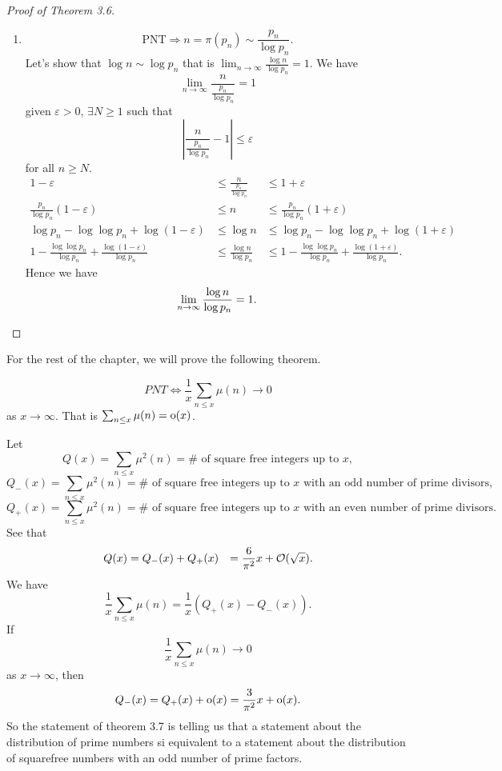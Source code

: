 \documentclass[twoside, openright, fontsize=10pt, headings=big]{scrbook}
\begin{document}
\begin{proof}[Proof of Theorem 3.6]
    \begin{enumerate}
        \item[(1)]
        \[
            \text{PNT}\Rightarrow n=\pi(p_n)\sim\frac{p_n}{\log p_n}.
        \]
        Let's show that $\log n\sim\log p_n$ that is $\lim_{n\to\infty}\frac{\log n}{\log p_n}=1$. We have
        \[
            \lim_{n\to\infty}\frac{n}{\frac{p_n}{\log p_n}}=1
        \]
        given $\varepsilon>0$, $\exists N\geq1$ such that
        \[
            \left|\frac{n}{\frac{p_n}{\log p_n}}-1\right|\leq\varepsilon
        \]
        for all $n\geq N$.
        \begin{align*}
            1-\varepsilon&\leq\frac{n}{\frac{p_n}{\log p_n}}&\leq1+\varepsilon\\
            \frac{p_n}{\log p_n}(1-\varepsilon)&\leq n&\leq\frac{p_n}{\log p_n}(1+\varepsilon)\\
            \log p_n-\log\log p_n+\log(1-\varepsilon)&\leq\log n&\leq\log p_n-\log\log p_n+\log(1+\varepsilon)\\
            1-\frac{\log\log p_n}{\log p_n}+\frac{\log(1-\varepsilon)}{\log p_n}&\leq\frac{\log n}{\log p_n}&\leq1-\frac{\log\log p_n}{\log p_n}+\frac{\log(1+\varepsilon)}{\log p_n}.
        \end{align*}
        Hence we have
        \[
            \lim_{n\to\infty}\frac{\log n}{\log p_n}=1.\qedhere
        \]
    \end{enumerate}
\end{proof}
For the rest of the chapter, we will prove the following theorem.
\begin{theorem}{}{}
    \[
        PNT\Leftrightarrow\frac{1}{x}\sum_{n\leq x}\mu(n)\to0
    \]
    as $x\to\infty$. That is $\sum_{n\leq x}\mu(n)=\oh(x)$.
\end{theorem}
\begin{remark}
    Let 
    \[
        Q(x)=\sum_{n\leq x}\mu^2(n)=\# \text{ of square free integers up to } x,
    \]
    \[
        Q_-(x)=\sum_{n\leq x}\mu^2(n)=\# \text{ of square free integers up to } x \text{ with an odd number of prime divisors},
    \]
    \[
        Q_+(x)=\sum_{n\leq x}\mu^2(n)=\# \text{ of square free integers up to } x \text{ with an even number of prime divisors}.
    \]
    See that
    \begin{align*}
        Q(x)&=Q_-(x)+Q_+(x)
        &=\frac{6}{\pi^2}x+\Oh(\sqrt{x}).
    \end{align*}
    We have 
    \[
        \frac{1}{x}\sum_{n\leq x}\mu(n)=\frac{1}{x}\left(Q_+(x)-Q_-(x)\right).
    \]
    If 
    \[
        \frac{1}{x}\sum_{n\leq x}\mu(n)\to0
    \]
    as $x\to\infty$, then
    \[
        Q_-(x)=Q_+(x)+\oh(x)=\frac{3}{\pi^2}x+\oh(x).
    \]
    So the statement of theorem 3.7 is telling us that a statement about the distribution of prime numbers si equivalent to a statement about the distribution of squarefree numbers with an odd number of prime factors.
\end{remark}
\end{document}
